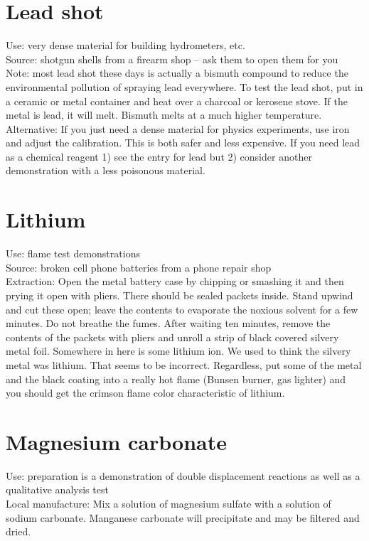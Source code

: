 \section{Lead shot}
Use: very dense material for building hydrometers, 
etc.\\
Source: shotgun shells from a firearm shop – 
ask them to open them for you\\
Note: most lead shot these days is actually a bismuth compound 
to reduce the environmental pollution of spraying lead everywhere. 
To test the lead shot, 
put in a ceramic or metal container 
and heat over a charcoal or kerosene stove. 
If the metal is lead, 
it will melt. 
Bismuth melts at a much higher temperature.\\
Alternative: If you just need a dense material for physics experiments, 
use iron and adjust the calibration. 
This is both safer and less expensive. 
If you need lead as a chemical reagent 
1) see the entry for lead but 
2) consider another demonstration with a less poisonous material.

\section{Lithium}
Use: flame test demonstrations\\
Source: broken cell phone batteries from a phone repair shop\\
Extraction: Open the metal battery case by chipping 
or smashing it and then prying it open with pliers. 
There should be sealed packets inside. 
Stand upwind and cut these open; 
leave the contents to evaporate the noxious solvent for a few minutes. 
Do not breathe the fumes. 
After waiting ten minutes, 
remove the contents of the packets with pliers 
and unroll a strip of black covered silvery metal foil. 
Somewhere in here is some lithium ion. 
We used to think the silvery metal was lithium. 
That seems to be incorrect. 
Regardless, put some of the metal and the black coating
into a really hot flame (Bunsen burner, gas lighter)
and you should get the crimson flame color
characteristic of lithium.

\section{Magnesium carbonate}
Use: preparation is a demonstration of double displacement reactions 
as well as a qualitative analysis test\\
Local manufacture: Mix a solution of magnesium sulfate 
with a solution of sodium carbonate. 
Manganese carbonate will precipitate and may be filtered and dried.

